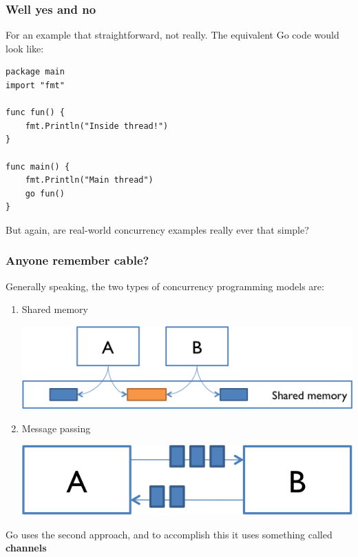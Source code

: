 \documentclass{beamer}
\begin{document}
\begin{frame}[fragile]
\frametitle{Well yes and no}

For an example that straightforward, not really. The equivalent Go code would look like:
\begin{lstlisting}
package main
import "fmt"

func fun() {
	fmt.Println("Inside thread!")
}

func main() {
	fmt.Println("Main thread")
	go fun()
}	
\end{lstlisting}

But again, are real-world concurrency examples really ever that simple?
\end{frame}

\begin{frame}[fragile]
\frametitle{Anyone remember cable?}

Generally speaking, the two types of concurrency programming models are:
\begin{enumerate}
\item Shared memory

\includegraphics[scale=0.5]{./images/shared-memory.png}

\item Message passing

\includegraphics[scale=0.5]{./images/message-passing.png}

\end{enumerate}

Go uses the second approach, and to accomplish this it uses something called \textbf{channels}

\end{frame}
\end{document}
